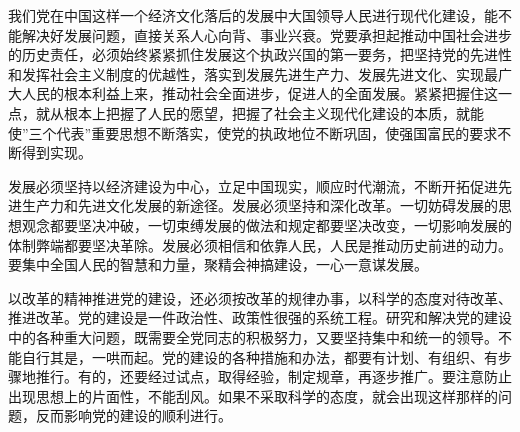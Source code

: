 \documentclass{njuthesis}
\begin{document}
我们党在中国这样一个经济文化落后的发展中大国领导人民进行现代化建设，能不能解决好发展问题，直接关系人心向背、事业兴衰。党要承担起推动中国社会进步的历史责任，必须始终紧紧抓住发展这个执政兴国的第一要务，把坚持党的先进性和发挥社会主义制度的优越性，落实到发展先进生产力、发展先进文化、实现最广大人民的根本利益上来，推动社会全面进步，促进人的全面发展。紧紧把握住这一点，就从根本上把握了人民的愿望，把握了社会主义现代化建设的本质，就能使”三个代表”重要思想不断落实，使党的执政地位不断巩固，使强国富民的要求不断得到实现。 

发展必须坚持以经济建设为中心，立足中国现实，顺应时代潮流，不断开拓促进先进生产力和先进文化发展的新途径。发展必须坚持和深化改革。一切妨碍发展的思想观念都要坚决冲破，一切束缚发展的做法和规定都要坚决改变，一切影响发展的体制弊端都要坚决革除。发展必须相信和依靠人民，人民是推动历史前进的动力。要集中全国人民的智慧和力量，聚精会神搞建设，一心一意谋发展。 



\begin{acknowledgement}
以改革的精神推进党的建设，还必须按改革的规律办事，以科学的态度对待改革、推进改革。党的建设是一件政治性、政策性很强的系统工程。研究和解决党的建设中的各种重大问题，既需要全党同志的积极努力，又要坚持集中和统一的领导。不能自行其是，一哄而起。党的建设的各种措施和办法，都要有计划、有组织、有步骤地推行。有的，还要经过试点，取得经验，制定规章，再逐步推广。要注意防止出现思想上的片面性，不能刮风。如果不采取科学的态度，就会出现这样那样的问题，反而影响党的建设的顺利进行。
\end{acknowledgement}

\end{document}
